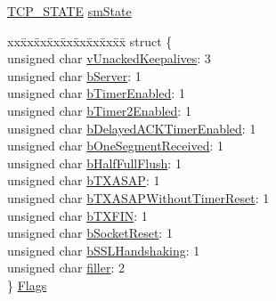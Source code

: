 \begin{DoxyCompactItemize}
\begin{tabbing}
\end{tabbing}\item 
\hyperlink{_t_c_p_8h_a9f513bc8ffaa5ca624acb2a33da18c47}{T\+C\+P\+\_\+\+S\+T\+A\+T\+E} \hyperlink{struct_t_c_b___s_t_u_b_a9967f98d64d8ef243bd27a487bac4ea9}{sm\+State}
\item 
\begin{tabbing}
xx\=xx\=xx\=xx\=xx\=xx\=xx\=xx\=xx\=\kill
struct \{\\
\>unsigned char \hyperlink{struct_t_c_b___s_t_u_b_aa2eabcef6e3f7cb140ddc43f3b0f01f2}{vUnackedKeepalives}: 3\\
\>unsigned char \hyperlink{struct_t_c_b___s_t_u_b_a820476689281baed6296b78b672c15e5}{bServer}: 1\\
\>unsigned char \hyperlink{struct_t_c_b___s_t_u_b_a876c8b9a4c092dc0006b7822efbeca27}{bTimerEnabled}: 1\\
\>unsigned char \hyperlink{struct_t_c_b___s_t_u_b_a6311e407a95b52b825d8f80d123eda7a}{bTimer2Enabled}: 1\\
\>unsigned char \hyperlink{struct_t_c_b___s_t_u_b_a97e8fa1695ed948d0a715a3b96bb6d8d}{bDelayedACKTimerEnabled}: 1\\
\>unsigned char \hyperlink{struct_t_c_b___s_t_u_b_a64467e967affbc7f3bd04af24a62255f}{bOneSegmentReceived}: 1\\
\>unsigned char \hyperlink{struct_t_c_b___s_t_u_b_ae4a588e677cd61e9d1d74d0001c41c42}{bHalfFullFlush}: 1\\
\>unsigned char \hyperlink{struct_t_c_b___s_t_u_b_abf1b4439c5f152ddb383859e5a0f3bd3}{bTXASAP}: 1\\
\>unsigned char \hyperlink{struct_t_c_b___s_t_u_b_a00a53181aee4d79828ae8e52c06a7787}{bTXASAPWithoutTimerReset}: 1\\
\>unsigned char \hyperlink{struct_t_c_b___s_t_u_b_a2b4e5624c7ff0110540b0b87b484c636}{bTXFIN}: 1\\
\>unsigned char \hyperlink{struct_t_c_b___s_t_u_b_a02643e9de8ceb55dd2a4669b53af4ba8}{bSocketReset}: 1\\
\>unsigned char \hyperlink{struct_t_c_b___s_t_u_b_a63180a6b39bd41e931e34cbd85e965f0}{bSSLHandshaking}: 1\\
\>unsigned char \hyperlink{struct_t_c_b___s_t_u_b_a3cc9af5814583d98e4724f5dfb86c5b8}{filler}: 2\\
\} \hyperlink{struct_t_c_b___s_t_u_b_aac87e60b8ab50d868f9d26157167faf9}{Flags}\\


\end{tabbing}
\end{DoxyCompactItemize}

